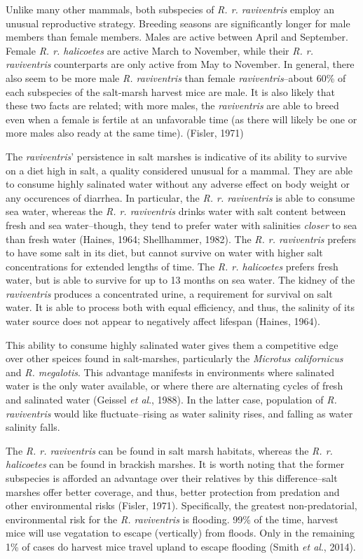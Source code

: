 \documentclass[a4paper]{article}
\begin{document}
Unlike many other mammals, both subspecies of \textit{R. r. raviventris} employ an unusual reproductive strategy. Breeding seasons are significantly longer for male members than female members. Males are active between April and September. Female \textit{R. r. halicoetes} are active March to November, while their \textit{R. r. raviventris} counterparts are only active from May to November. In general, there also seem to be more male \textit{R. raviventris} than female \textit{raviventris}--about 60\% of each subspecies of the salt-marsh harvest mice are male. It is also likely that these two facts are related; with more males, the \textit{raviventris} are able to breed even when a female is fertile at an unfavorable time (as there will likely be one or more males also ready at the same time). (Fisler, 1971)

The \textit{raviventris}' persistence in salt marshes is indicative of its ability to survive on a diet high in salt, a quality considered unusual for a mammal. They are able to consume highly salinated water without any adverse effect on body weight or any occurences of diarrhea. In particular, the \textit{R. r. raviventris} is able to consume sea water, whereas the \textit{R. r. raviventris} drinks water with salt content between fresh and sea water--though, they tend to prefer water with salinities \textit{closer} to sea than fresh water (Haines, 1964; Shellhammer, 1982). The \textit{R. r. raviventris} prefers to have some salt in its diet, but cannot survive on water with higher salt concentrations for extended lengths of time. The \textit{R. r. halicoetes} prefers fresh water, but is able to survive for up to 13 months on sea water. The kidney of the \textit{raviventris} produces a concentrated urine, a requirement for survival on salt water. It is able to process both with equal efficiency, and thus, the salinity of its water source does not appear to negatively affect lifespan (Haines, 1964).

This ability to consume highly salinated water gives them a competitive edge over other speices found in salt-marshes, particularly the \textit{Microtus californicus} and \textit{R. megalotis}. This advantage manifests in environments where salinated water is the only water available, or where there are alternating cycles of fresh and salinated water (Geissel \textit{et al}., 1988). In the latter case, population of \textit{R. raviventris} would like fluctuate--rising as water salinity rises, and falling as water salinity falls.

The \textit{R. r. raviventris} can be found in salt marsh habitats, whereas the \textit{R. r. halicoetes} can be found in brackish marshes. It is worth noting that the former subspecies is afforded an advantage over their relatives by this difference--salt marshes offer better coverage, and thus, better protection from predation and other environmental risks (Fisler, 1971). Specifically, the greatest non-predatorial, environmental risk for the \textit{R. raviventris} is flooding. 99\% of the time, harvest mice will use vegatation to escape (vertically) from floods. Only in the remaining 1\% of cases do harvest mice travel upland to escape flooding (Smith \textit{et al}., 2014).
\end{document}
